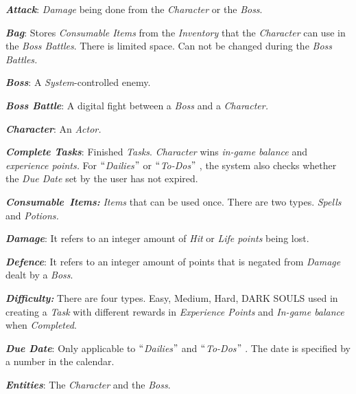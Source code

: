 \documentclass[12pt]{report}
\renewcommand{\_}{\kern-1.5pt\textunderscore\kern-1.5pt}
\begin{document}
\textbf{\textit{Attack}}: \textit{Damage }being done from the \textit{Character }or the\textit{ Boss}.\par

\textbf{\textit{Bag}}: Stores \textit{Consumable Items} from the \textit{Inventory }that the \textit{Character} can use in the \textit{Boss Battles}. There is limited space. Can not be changed during the \textit{Boss Battles.}\par

\textbf{\textit{Boss}}: \textcolor[HTML]{222222}{A \textit{System}-controlled enemy.}\par

\textbf{\textit{\textcolor[HTML]{222222}{Boss Battle}}}: \textcolor[HTML]{222222}{A digital fight between a\textit{ Boss }and a \textit{Character.}}\par

\textbf{\textit{Character}}: An \textit{Actor.}\par

\textbf{\textit{Complete Tasks}}: Finished \textit{Tasks}. \textit{Character} wins \textit{in-game balance} and \textit{experience points. }For $``$\textit{Dailies}$"$  or $``$\textit{To-Dos$"$ }, the system also checks whether the \textit{Due Date} set by the user has not expired.\par

\textbf{\textit{Consumable\ Items:  }}\textit{Items} that can be used once. There are two types. \textit{Spells} and \textit{Potions.}\par

\textbf{\textit{Damage}}: It refers to an integer amount of \textit{Hit }or \textit{Life points }being lost.\par

\textbf{\textit{Defence}}: It refers to an integer amount of points that is negated from \textit{Damage }dealt by a \textit{Boss}.\par

\textbf{\textit{Difficulty: }}There are four types. Easy, Medium, Hard, DARK SOULS used in creating a \textit{Task }with different rewards in \textit{Experience Points} and \textit{In-game balance }when \textit{Completed}.\par

\textbf{\textit{Due Date}}: Only applicable to $``$\textit{Dailies$"$ } and $``$\textit{To-Dos$"$ }. The date is specified by a number in the calendar.\par

\textbf{\textit{Entities}}: The \textit{Character} and the\textit{ Boss}.\par
\end{document}
